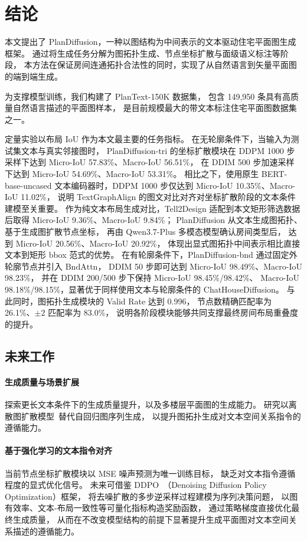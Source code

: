 \section{结论}
\label{sec:conclusion}

本文提出了 PlanDiffusion，一种以图结构为中间表示的文本驱动住宅平面图生成框架。
通过将生成任务分解为图拓扑生成、节点坐标扩散与面级语义标注等阶段，
本方法在保证房间连通拓扑合法性的同时，实现了从自然语言到矢量平面图的端到端生成。

为支撑模型训练，我们构建了 PlanText-150K 数据集，
包含 149,950 条具有高质量自然语言描述的平面图样本，
是目前规模最大的带文本标注住宅平面图数据集之一。

定量实验以布局 IoU 作为本文最主要的任务指标。
在无轮廓条件下，当输入为测试集文本与真实邻接图时，
PlanDiffusion-tri 的坐标扩散模块在 DDPM 1000 步采样下达到
Micro-IoU 57.83\%、Macro-IoU 56.51\%，
在 DDIM 500 步加速采样下达到 Micro-IoU 54.69\%、Macro-IoU 53.31\%。
相比之下，使用原生 BERT-base-uncased 文本编码器时，DDPM 1000 步仅达到
Micro-IoU 10.35\%、Macro-IoU 11.02\%，
说明 TextGraphAlign 的图文对比对齐对坐标扩散阶段的文本条件建模至关重要。
作为纯文本布局生成对比，Tell2Design 适配到本文矩形筛选数据后取得
Micro-IoU 9.36\%、Macro-IoU 9.84\%；
PlanDiffusion 从文本生成图拓扑、基于生成图扩散节点坐标，
再由 Qwen3.7-Plus 多模态模型确认房间类型后，
达到 Micro-IoU 20.56\%、Macro-IoU 20.92\%，
体现出显式图拓扑中间表示相比直接文本到矩形 bbox 范式的优势。
在有轮廓条件下，PlanDiffusion-bnd 通过固定外轮廓节点并引入 $\mathrm{BndAttn}$，
DDIM 50 步即可达到 Micro-IoU 98.49\%、Macro-IoU 98.23\%，
并在 DDIM 200/500 步下保持 Micro-IoU 98.45\%/98.42\%、
Macro-IoU 98.18\%/98.15\%，显著优于同样使用文本与轮廓条件的 ChatHouseDiffusion。
与此同时，图拓扑生成模块的 Valid Rate 达到 0.996，
节点数精确匹配率为 26.1\%、$\pm2$ 匹配率为 83.0\%，
说明各阶段模块能够共同支撑最终房间布局重叠度的提升。


\subsection{未来工作}
\label{subsec:future_work}

\paragraph{生成质量与场景扩展}
探索更长文本条件下的生成质量提升，以及多楼层平面图的生成能力。
研究以离散图扩散模型~\cite{vignac2022digress}替代自回归图序列生成，
以提升图拓扑生成对文本空间关系指令的遵循能力。

\paragraph{基于强化学习的文本指令对齐}
当前节点坐标扩散模块以 MSE 噪声预测为唯一训练目标，
缺乏对文本指令遵循程度的显式优化信号。
未来可借鉴 DDPO~\cite{black2024ddpo}（Denoising Diffusion Policy Optimization）框架，
将去噪扩散的多步逆采样过程建模为序列决策问题，
以图有效率、文本-布局一致性等可量化指标构造奖励函数，
通过策略梯度直接优化最终生成质量，
从而在不改变模型结构的前提下显著提升生成平面图对文本空间关系描述的遵循能力。

